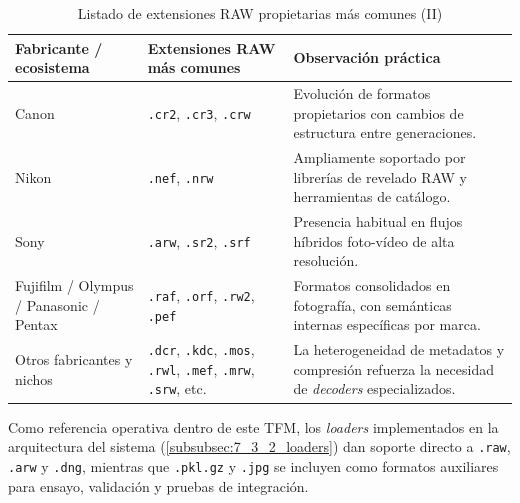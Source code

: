 \begin{table}[htbp]
    \centering
    \footnotesize
    \renewcommand{\arraystretch}{1.15}
    \setlength{\tabcolsep}{4pt}
    \begin{tabularx}{\textwidth}{|>{\hsize=0.75\hsize\raggedright\arraybackslash}X|>{\hsize=1.35\hsize\raggedright\arraybackslash}X|>{\hsize=0.90\hsize\raggedright\arraybackslash}X|}
        \hline
        \rowcolor[gray]{0.90}
        \textbf{Fabricante / ecosistema} & \textbf{Extensiones RAW más comunes} & \textbf{Observación práctica} \\
        \hline
        Canon & \texttt{.cr2}, \texttt{.cr3}, \texttt{.crw} & Evolución de formatos propietarios con cambios de estructura entre generaciones. \\
        \hline
        Nikon & \texttt{.nef}, \texttt{.nrw} & Ampliamente soportado por librerías de revelado RAW y herramientas de catálogo. \\
        \hline
        Sony & \texttt{.arw}, \texttt{.sr2}, \texttt{.srf} & Presencia habitual en flujos híbridos foto-vídeo de alta resolución. \\
        \hline
        Fujifilm / Olympus / Panasonic / Pentax & \texttt{.raf}, \texttt{.orf}, \texttt{.rw2}, \texttt{.pef} & Formatos consolidados en fotografía, con semánticas internas específicas por marca. \\
        \hline
        Otros fabricantes y nichos & \texttt{.dcr}, \texttt{.kdc}, \texttt{.mos}, \texttt{.rwl}, \texttt{.mef}, \texttt{.mrw}, \texttt{.srw}, etc. & La heterogeneidad de metadatos y compresión refuerza la necesidad de \textit{decoders} especializados. \\
        \hline
    \end{tabularx}
    \caption{Listado de extensiones RAW propietarias más comunes (II)}
    \label{tab:appendix_c_raw_formats_common_ii}
\end{table}

Como referencia operativa dentro de este TFM, los \textit{loaders}
implementados en la arquitectura del sistema (\autoref{subsubsec:7_3_2_loaders}) dan soporte directo a
\texttt{.raw}, \texttt{.arw} y \texttt{.dng}, mientras que
\texttt{.pkl.gz} y \texttt{.jpg} se incluyen como formatos auxiliares para
ensayo, validación y pruebas de integración.
